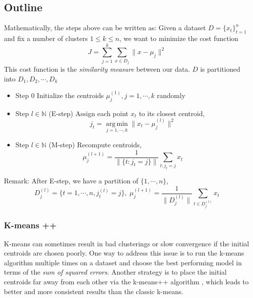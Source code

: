 \subsection{Outline}
Mathematically, the steps above can be written as:
Given a dataset $D = \bigl\{x_t\bigr\}^n_{t=1}$ and fix a number of clusters $1 \leq k \leq n$, we want to minimize the cost function 
\begin{equation*}
J = \sum_{j=1}^k \sum_{x \in D_j} \lVert x-\mu_j \rVert ^2
\end{equation*}
This cost function is the \textit{similarity measure} between our data. 
$D$ is partitioned into $D_1, D_2, \cdots, D_k$

\begin{itemize}
	\item Step 0 Initialize the centroids $\mu_{j}^{(1)}, j = 1,\cdots,k$ randomly 
	
	\item Step $l \in \mathbb{N}$ (E-step) Assign each point $x_t$ to its closest centroid, \begin{equation}\label{eq:3.1}
	j_t = \operatorname*{arg\,min}_{j=1,\cdots,k} \lVert x_t-\mu_j^{(l)} \rVert ^2
	\end{equation}
	\item Step $l \in \mathbb{N}$ (M-step) Recompute centroids, 
	\begin{equation}\label{eq:3.2}
	\mu_{j}^{(l+1)} = \frac{1}{\bigl\|\bigl\{t:j_t=j \bigr\}\bigr\|}\sum_{t:j_t=j} x_t
	\end{equation}
\end{itemize}

Remark: After E-step, we have a partition of $\bigl\{1,\cdots,n\bigr\}$, 
\begin{equation*}
D_j^{(l)}=\bigl\{t=1,\cdots,n,j_t^{(l)}=j\bigr\},\; \mu_j^{(l+1)} = \frac{1}{\bigl\|D_j^{(l)}\bigr\|}\sum_{t \in D_j^{(l)}}x_t
\end{equation*}

\subsubsection{K-means ++}

K-means can sometimes result in bad clusterings or slow convergence if the initial centroids are chosen poorly. One way to address this issue is to run the k-means algorithm multiple times on a dataset and choose the best performing model in terms of the \textit{sum of squared errors}. Another strategy is to place the initial centroids far away from each other via the k-means++ algorithm \cite{Arthur2007}, which leads to better and more consistent results than the classic k-means.

